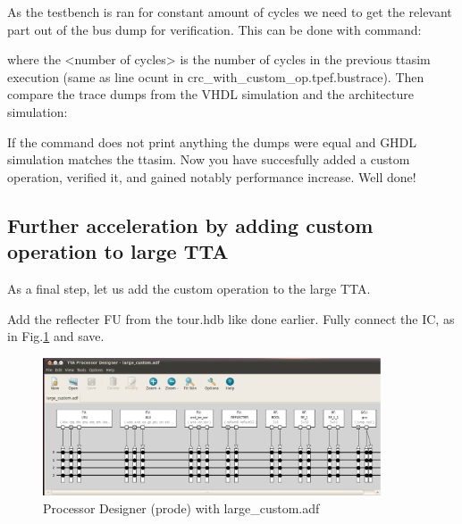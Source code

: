 \documentclass[twoside]{tceusermanual}
\begin{document}
As the testbench is ran for constant amount of cycles we
need to get the relevant part out of the bus dump for
verification. This can be done with command:


where the <number of cycles> is the number of cycles in the previous
ttasim execution (same as line ocunt in
crc\_with\_custom\_op.tpef.bustrace). Then compare the trace dumps
from the VHDL simulation and the architecture simulation:


If the command does not print anything the dumps were equal and GHDL
simulation matches the ttasim. Now you have succesfully added a custom
operation, verified it, and gained notably performance increase. Well
done!


\subsection{Further acceleration by adding custom operation to large TTA}
\label{ssec:large_custom}

As a final step, let us add the custom operation to the large TTA.



%

Add the reflecter FU from the tour.hdb like done earlier. Fully
connect the IC, as in Fig.\ref{fig:prode_largecustom} and save.

\begin{figure}
  \begin{center}
    \includegraphics[width=10cm]{eps/prode_largecustom}
    \caption{Processor Designer (prode) with large\_custom.adf}
    \label{fig:prode_largecustom}
  \end{center}
\end{figure}
\end{document}
